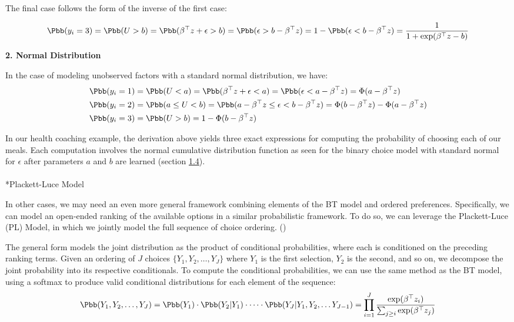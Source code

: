 \documentclass[
  letterpaper,
  DIV=11,
  numbers=noendperiod,
  oneside]{scrreprt}
\makeatletter
\let\oldparagraph\paragraph
\renewcommand{\paragraph}{
    \@ifstar
      \xxxParagraphStar
      \xxxParagraphNoStar
  }
\newcommand{\xxxParagraphStar}[1]{\oldparagraph*{#1}\mbox{}}
\newcommand{\xxxParagraphNoStar}[1]{\oldparagraph{#1}\mbox{}}
\theoremstyle{remark}
\makeatother
\begin{document}
The final case follows the form of the inverse of the first case:

\[\Pbb(y_i = 3) = \Pbb(U > b) = \Pbb(\beta^\top z + \epsilon > b ) = \Pbb( \epsilon > b - \beta^\top z) = 1 - \Pbb( \epsilon < b - \beta^\top z) = \frac{1}{1 + \exp(\beta^\top z - b)}\]

\textbf{2. Normal Distribution}

In the case of modeling unobserved factors with a standard normal
distribution, we have: \[\begin{split}
    \Pbb(y_i = 1) & = \Pbb(U < a) = \Pbb(\beta^\top z + \epsilon < a ) = \Pbb( \epsilon < a - \beta^\top z) = \Phi(a - \beta^\top z) \\
    \Pbb(y_i = 2) & = \Pbb(a \le U < b) 
    = \Pbb(a - \beta^\top z \le \epsilon < b - \beta^\top z) = \Phi(b - \beta^\top z) - \Phi(a - \beta^\top z) \\
    \Pbb(y_i = 3) & = \Pbb(U > b) 
    = 1 - \Phi(b - \beta^\top z) 
\end{split}\]

In our health coaching example, the derivation above yields three exact
expressions for computing the probability of choosing each of our meals.
Each computation involves the normal cumulative distribution function as
seen for the binary choice model with standard normal for \(\epsilon\)
after parameters \(a\) and \(b\) are learned (section
\hyperref[sec:learning]{1.4}).

\paragraph*{Plackett-Luce Model}\label{plackett-luce-model}

In other cases, we may need an even more general framework combining
elements of the BT model and ordered preferences. Specifically, we can
model an open-ended ranking of the available options in a similar
probabilistic framework. To do so, we can leverage the Plackett-Luce
(PL) Model, in which we jointly model the full sequence of choice
ordering. ()

The general form models the joint distribution as the product of
conditional probabilities, where each is conditioned on the preceding
ranking terms. Given an ordering of \(J\) choices
\(\{Y_1, Y_2, \dots, Y_J\}\) where \(Y_1\) is the first selection,
\(Y_2\) is the second, and so on, we decompose the joint probability
into its respective conditionals. To compute the conditional
probabilities, we can use the same method as the BT model, using a
softmax to produce valid conditional distributions for each element of
the sequence:
\[\Pbb(Y_1, Y_2, \dots, Y_J) = \Pbb(Y_1) \cdot \Pbb(Y_2 | Y_1) \cdot \dots \cdot \Pbb(Y_J | Y_1, Y_2, \dots Y_{J - 1}) = \prod_{i = 1}^J \frac{\exp(\beta^\top z_i)}{\sum_{j \ge i} \exp(\beta^\top z_j)}\]
\end{document}
